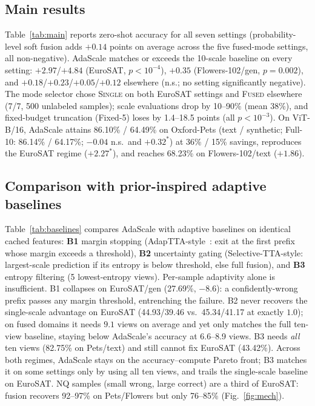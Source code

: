 \documentclass{article}
\begin{document}
\subsection{Main results}
\label{sec:main_results}
Table~\ref{tab:main} reports zero-shot accuracy for all seven settings
(probability-level soft fusion adds $+0.14$ points on average across
the five fused-mode settings, all non-negative).
AdaScale matches or exceeds the 10-scale baseline on every setting:
$+2.97$/$+4.84$ (EuroSAT, $p{<}10^{-4}$), $+0.35$ (Flowers-102/gen,
$p{=}0.002$), and $+0.18$/$+0.23$/$+0.05$/$+0.12$ elsewhere
(n.s.; no setting significantly negative). The mode
selector chose \textsc{Single} on both EuroSAT settings and
\textsc{Fused} elsewhere (7/7, 500 unlabeled samples); scale
evaluations drop by 10--90\% (mean 38\%), and fixed-budget truncation
(Fixed-5) loses by 1.4--18.5 points (all $p{<}10^{-3}$). On ViT-B/16, AdaScale attains
86.10\% / 64.49\% on Oxford-Pets (text / synthetic; Full-10:
86.14\% / 64.17\%; $-0.04$ n.s.\ and $+0.32^{*}$) at 36\% / 15\%
savings, reproduces the EuroSAT regime ($+2.27^{*}$), and reaches
68.23\% on Flowers-102/text ($+1.86$).



\subsection{Comparison with prior-inspired adaptive baselines}
\label{sec:baselines}
Table~\ref{tab:baselines} compares AdaScale with adaptive baselines on
identical cached features: \textbf{B1} margin
stopping (AdapTTA-style~\cite{mocerino2021adaptta}: exit at the first
prefix whose margin exceeds a threshold), \textbf{B2} uncertainty
gating (Selective-TTA-style: largest-scale prediction if its entropy is
below threshold, else full fusion), and \textbf{B3} entropy filtering
(5 lowest-entropy views).
Per-sample adaptivity alone is insufficient. B1 collapses on
EuroSAT/gen (27.69\%, $-8.6$): a confidently-wrong prefix passes any
margin threshold, entrenching the failure. B2 never recovers
the single-scale advantage on EuroSAT (44.93/39.46 vs.\ 45.34/41.17 at
exactly $1.0$); on fused domains it needs $9.1$ views on average and
yet only matches the full ten-view baseline, staying below AdaScale's
accuracy at 6.6--8.9 views. B3 needs
\emph{all} ten views (82.75\% on Pets/text) and still cannot fix
EuroSAT (43.42\%). Across both regimes, AdaScale stays on the
accuracy--compute Pareto front; B3 matches it on some settings only by
using all ten views, and trails the single-scale baseline on EuroSAT.
NQ samples (small wrong, large correct) are a third of EuroSAT:
fusion recovers 92--97\% on Pets/Flowers but only 76--85\%
(Fig.~\ref{fig:mech}).
\end{document}
